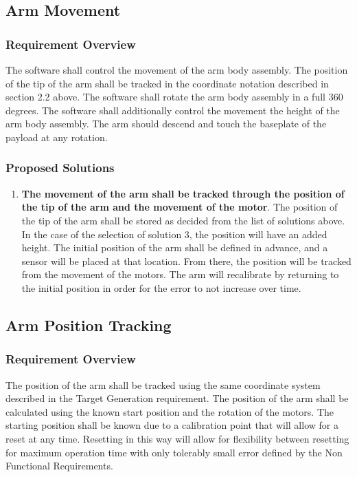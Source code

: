 \documentclass[letterpaper,10pt]{article}
\begin{document}
\subsection{Arm Movement}
\subsubsection{Requirement Overview}
The software shall control the movement of the arm body assembly. 
The position of the tip of the arm shall be tracked in the coordinate notation described in section 2.2 above.
The software shall rotate the arm body assembly in a full 360 degrees.
The software shall additionally control the movement the height of the arm body assembly.
The arm should descend and touch the baseplate of the payload at any rotation.
\subsubsection{Proposed Solutions}
\begin{enumerate}
\item{
\textbf{The movement of the arm shall be tracked through the position of the tip of the arm and the 
movement of the motor}. The position of the tip of the arm shall be stored as decided from the list
of solutions above. In the case of the selection of solution 3, the position will have an added 
height. The initial position of the arm shall be defined in advance, and a sensor will be placed at
that location. From there, the position will be tracked from the movement of the motors.
The arm will recalibrate by returning to the initial position in order for the error to not increase
over time.
}
\end{enumerate}

\subsection{Arm Position Tracking}
\subsubsection{Requirement Overview}
The position of the arm shall be tracked using the same coordinate system described in the Target Generation requirement.
The position of the arm shall be calculated using the known start position and the rotation of the motors.
The starting position shall be known due to a calibration point that will allow for a reset at any time.
Resetting in this way will allow for flexibility between resetting for maximum operation time with only tolerably small error defined by the Non Functional Requirements.
\end{document}
